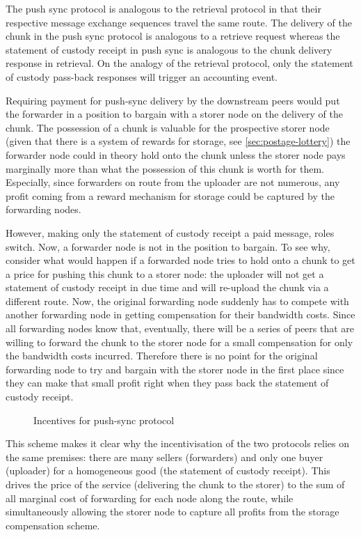 The push sync protocol is analogous to 
the retrieval protocol in that their respective message exchange sequences travel the same route.
The delivery of the chunk in the push sync protocol is analogous to a retrieve request whereas the statement of custody receipt in push sync is analogous to the chunk delivery response in retrieval. On the analogy of the retrieval  protocol, only the statement of custody  pass-back responses will trigger an accounting event.

Requiring payment for push-sync delivery by the downstream peers would put the forwarder in a position to bargain with a storer node on the delivery of the chunk. The possession of a chunk is valuable for the prospective storer node (given that there is a system of rewards  for storage, see \ref{sec:postage-lottery}) the forwarder node could in theory hold onto the chunk unless the storer node pays marginally more than what the possession of this chunk is worth for them. Especially, since forwarders on route from the uploader are not numerous, any profit coming from a reward mechanism for storage could be captured by the forwarding nodes.

However,  making only the statement of custody receipt a paid message, roles switch. Now, a forwarder node is not in the position to bargain. To see why, consider what would happen if a forwarded node tries to hold onto a chunk to get a price for pushing this chunk to a storer node: the uploader will not get a statement of custody receipt in due time and will re-upload the chunk via a different route. Now, the original forwarding node suddenly has to compete with another forwarding node in getting compensation for their bandwidth costs. Since all forwarding nodes know that, eventually, there will be a series of peers that are willing to forward the chunk to the storer node for a small compensation for only the bandwidth costs incurred. Therefore there is no point for the original forwarding node to try and bargain with the storer node in the first place since they can make that small  profit right when they pass back the statement of custody receipt.

\begin{figure}[htbp]
\centering
\caption[Incentives for push-sync protocol]{Incentives for push-sync protocol}
\label{fig:syncing-swap}
\end{figure}

This scheme makes it clear why the incentivisation of the two  protocols relies on the same premises: there are many sellers (forwarders) and only one buyer (uploader) for a homogeneous good (the statement of custody receipt). This drives the price of the service (delivering the chunk to the storer) to the sum of all marginal cost of forwarding for each node along the route, while simultaneously allowing the storer node to capture all profits from the storage compensation scheme.


